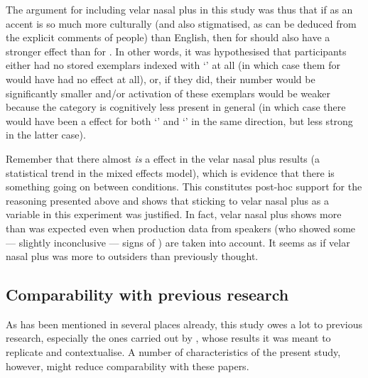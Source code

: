 The argument for including velar nasal plus in this study was thus that if  as an accent is so much more culturally  (and also stigmatised, as can be deduced from the explicit comments of people) than  English, then  for  should also have a stronger effect than  for .
In other words, it was hypothesised that participants either had no stored exemplars indexed with `' at all (in which case  them for  would have had no effect at all), or, if they did, their number would be significantly smaller and/or activation of these exemplars would be weaker because the category is cognitively less present in general (in which case there would have been a  effect for both `' and `' in the same direction, but less strong in the latter case).

Remember that there almost \emph{is} a  effect in the velar nasal plus results (a statistical trend in the mixed effects model), which is evidence that there is something going on between  conditions.
This constitutes post-hoc support for the reasoning presented above and shows that sticking to velar nasal plus as a variable in this experiment was justified.
In fact, velar nasal plus shows more  than was expected even when production data from  speakers (who showed some --- slightly inconclusive --- signs of ) are taken into account.
It seems as if velar nasal plus was more  to outsiders than previously thought.

		\subsection{Comparability with previous research}

As has been mentioned in several places already, this study owes a lot to previous research, especially the ones carried out by \textcite{niedzielski1999,hayetal2006a,hayetal2006b,haydrager2010}, whose results it was meant to replicate and contextualise.
A number of characteristics of the present study, however, might reduce comparability with these papers.

